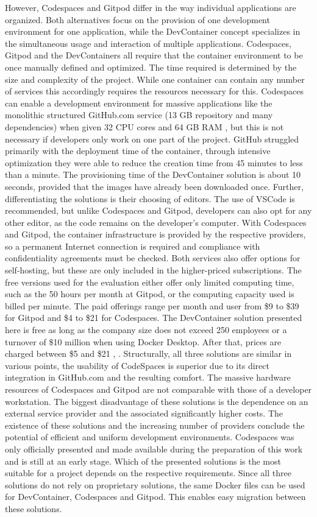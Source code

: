         However, Codespaces and Gitpod differ in the way individual applications are organized. Both alternatives focus on the provision of one development environment for one application, while the DevContainer concept specializes in the simultaneous usage and interaction of multiple applications. Codespaces, Gitpod and the DevContainers all require that the container environment to be once manually defined and optimized. The time required is determined by the size and complexity of the project. While one container can contain any number of services this accordingly requires the resources necessary for this. Codespaces can enable a development environment for massive applications like the monolithic structured GitHub.com service (13 GB repository and many dependencies) when given 32 CPU cores and 64 GB RAM \cite{githubblogcodespace}, but this is not necessary if developers only work on one part of the project. GitHub struggled primarily with the deployment time of the container, through intensive optimization they were able to reduce the creation time from 45 minutes to less than a minute. The provisioning time of the DevContainer solution is about 10 seconds, provided that the images have already been downloaded once. Further, differentiating the solutions is their choosing of editors. The use of VSCode is recommended, but unlike Codespaces and Gitpod, developers can also opt for any other editor, as the code remains on the developer's computer.  With Codespaces and Gitpod, the container infrastructure is provided by the respective providers, so a permanent Internet connection is required and compliance with confidentiality agreements must be checked. Both services also offer options for self-hosting, but these are only included in the higher-priced subscriptions. The free versions used for the evaluation either offer only limited computing time, such as the 50 hours per month at Gitpod, or the computing capacity used is billed per minute. The paid offerings range per month and user from \$9 to \$39 for Gitpod and \$4 to \$21 for Codespaces. The DevContainer solution presented here is free as long as the company size does not exceed 250 employees or a turnover of \$10 million when using Docker Desktop. After that, prices are charged between \$5 and \$21 \cite{gitpod}, \cite{githubblogcodespace}.
        Structurally, all three solutions are similar in various points, the usability of CodeSpaces is superior due to its direct integration in GitHub.com and the resulting comfort. The massive hardware resources of Codespaces and Gitpod are not comparable with those of a developer workstation. The biggest disadvantage of these solutions is the dependence on an external service provider and the associated significantly higher costs. The existence of these solutions and the increasing number of providers conclude the potential of efficient and uniform development environments. Codespaces was only officially presented and made available during the preparation of this work and is still at an early stage. Which of the presented solutions is the most suitable for a project depends on the respective requirements. Since all three solutions do not rely on proprietary solutions, the same Docker files can be used for DevContainer, Codespaces and Gitpod. This enables easy migration between these solutions.


